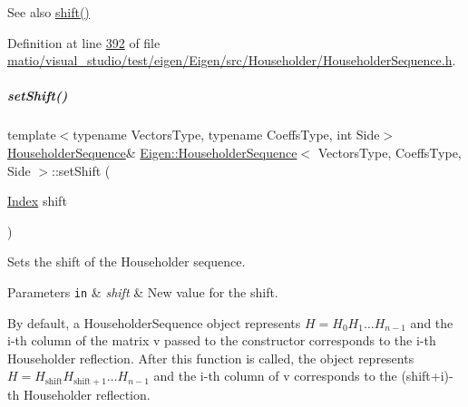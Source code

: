 \begin{DoxySeeAlso}{See also}
\hyperlink{group___householder___module_a34482bfad5563fd8a8a4264db76ac917}{shift()} 
\end{DoxySeeAlso}


Definition at line \hyperlink{matio_2visual__studio_2test_2eigen_2_eigen_2src_2_householder_2_householder_sequence_8h_source_l00392}{392} of file \hyperlink{matio_2visual__studio_2test_2eigen_2_eigen_2src_2_householder_2_householder_sequence_8h_source}{matio/visual\+\_\+studio/test/eigen/\+Eigen/src/\+Householder/\+Householder\+Sequence.\+h}.

\mbox{\label{group___householder___module_a2d8d996ce1085fd977850988735739f0}} 
\subparagraph{\texorpdfstring{set\+Shift()}{setShift()}\hspace{0.1cm}{\footnotesize\ttfamily [2/2]}}
{\footnotesize\ttfamily template$<$typename Vectors\+Type, typename Coeffs\+Type, int Side$>$ \\
\hyperlink{group___householder___module_class_eigen_1_1_householder_sequence}{Householder\+Sequence}\& \hyperlink{group___householder___module_class_eigen_1_1_householder_sequence}{Eigen\+::\+Householder\+Sequence}$<$ Vectors\+Type, Coeffs\+Type, Side $>$\+::set\+Shift (\begin{DoxyParamCaption}\item[{\hyperlink{group___core___module_a554f30542cc2316add4b1ea0a492ff02}{Index}}]{shift }\end{DoxyParamCaption})\hspace{0.3cm}{\ttfamily [inline]}}



Sets the shift of the Householder sequence. 


\begin{DoxyParams}[1]{Parameters}
\mbox{\tt in}  & {\em shift} & New value for the shift.\\
\hline
\end{DoxyParams}
By default, a Householder\+Sequence object represents $ H = H_0 H_1 \ldots H_{n-1} $ and the i-\/th column of the matrix {\ttfamily v} passed to the constructor corresponds to the i-\/th Householder reflection. After this function is called, the object represents $ H = H_{\mathrm{shift}} H_{\mathrm{shift}+1} \ldots H_{n-1} $ and the i-\/th column of {\ttfamily v} corresponds to the (shift+i)-\/th Householder reflection.

